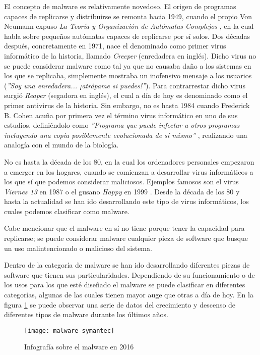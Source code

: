 El concepto de malware es relativamente novedoso. El origen de programas capaces de replicarse y distribuirse se remonta hacia 1949, cuando el propio Von Neumann expuso \emph{La Teoría y Organización de Autómatas Complejos} \cite{von-neumann}, en la cual habla sobre pequeños autómatas capaces de replicarse por sí solos. Dos décadas después, concretamente en 1971, nace el denominado como primer virus informático de la historia, llamado \emph{Creeper} \cite{creeper} (enredadera en inglés).  Dicho virus no se puede considerar malware como tal ya que no causaba daño a los sistemas en los que se replicaba, simplemente mostraba un inofensivo mensaje a los usuarios (\textsl{''Soy una enredadera... ¡atrápame si puedes!''}). Para contrarrestar dicho virus surgió \emph{Reaper} (segadora en inglés), el cual a día de hoy es denominado como el primer antivirus de la historia. Sin embargo, no es hasta 1984 cuando Frederick B. Cohen acuña por primera vez el término virus informático en uno de sus estudios, definiéndolo como \emph{''Programa que puede infectar a otros programas incluyendo una copia posiblemente evolucionada de sí mismo''} \cite{panda-virus-history}, realizando una analogía con el mundo de la biología.

No es hasta la década de los 80, en la cual los ordenadores personales empezaron a emerger en los hogares, cuando se comienzan a desarrollar virus informáticos a los que sí que podemos considerar maliciosos. Ejemplos famosos son el virus \emph{Viernes 13} en 1987 o el gusano \emph{Happy} en 1999 \cite{panda-virus-history}. Desde la década de los 80 y hasta la actualidad se han ido desarrollando este tipo de virus informáticos, los cuales podemos clasificar como malware.

Cabe mencionar que el malware en sí no tiene porque tener la capacidad para replicarse; se puede considerar malware cualquier pieza de software que busque un uso malintencionado o malicioso del sistema.

Dentro de la categoría de malware se han ido desarrollando diferentes piezas de software que tienen sus particularidades. Dependiendo de su funcionamiento o de los usos para los que esté diseñado el malware se puede clasificar en diferentes categorías, algunas de las cuales tienen mayor auge que otras a día de hoy. En la figura \ref{fig:malware-symantec} se puede observar una serie de datos del crecimiento y descenso de diferentes tipos de malware durante los últimos años.

\begin{figure}[H]
	\centering
	\texttt{[image: malware-symantec]}
	\caption{Infografía sobre el malware en 2016 \cite{malware-symantec}}
	\label{fig:malware-symantec}
\end{figure}

